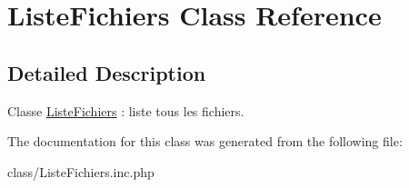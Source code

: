 \hypertarget{class_liste_fichiers}{
\section{ListeFichiers Class Reference}
\label{class_liste_fichiers}
}


\subsection{Detailed Description}
Classe \hyperlink{class_liste_fichiers}{ListeFichiers} : liste tous les fichiers. 

The documentation for this class was generated from the following file:\begin{DoxyCompactItemize}
\item 
class/ListeFichiers.inc.php\end{DoxyCompactItemize}
